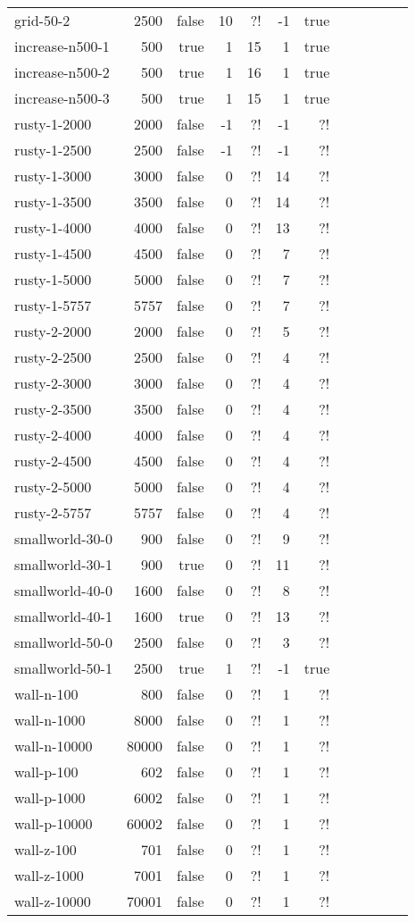 \documentclass{tufte-handout}
\begin{document}
\begin{longtable}{lrrrrrrrrrrr}
	grid-50-2 & 2500 & false & 10 & ?! & -1 & true\\
	increase-n500-1 & 500 & true & 1 & 15 & 1 & true\\
	increase-n500-2 & 500 & true & 1 & 16 & 1 & true\\
	increase-n500-3 & 500 & true & 1 & 15 & 1 & true\\
	rusty-1-2000 & 2000 & false & -1 & ?! & -1 & ?!\\
	rusty-1-2500 & 2500 & false & -1 & ?! & -1 & ?!\\
	rusty-1-3000 & 3000 & false & 0 & ?! & 14 & ?!\\
	rusty-1-3500 & 3500 & false & 0 & ?! & 14 & ?!\\
	rusty-1-4000 & 4000 & false & 0 & ?! & 13 & ?!\\
	rusty-1-4500 & 4500 & false & 0 & ?! & 7 & ?!\\
	rusty-1-5000 & 5000 & false & 0 & ?! & 7 & ?!\\
	rusty-1-5757 & 5757 & false & 0 & ?! & 7 & ?!\\
	rusty-2-2000 & 2000 & false & 0 & ?! & 5 & ?!\\
	rusty-2-2500 & 2500 & false & 0 & ?! & 4 & ?!\\
	rusty-2-3000 & 3000 & false & 0 & ?! & 4 & ?!\\
	rusty-2-3500 & 3500 & false & 0 & ?! & 4 & ?!\\
	rusty-2-4000 & 4000 & false & 0 & ?! & 4 & ?!\\
	rusty-2-4500 & 4500 & false & 0 & ?! & 4 & ?!\\
	rusty-2-5000 & 5000 & false & 0 & ?! & 4 & ?!\\
	rusty-2-5757 & 5757 & false & 0 & ?! & 4 & ?!\\
	smallworld-30-0 & 900 & false & 0 & ?! & 9 & ?!\\
	smallworld-30-1 & 900 & true & 0 & ?! & 11 & ?!\\
	smallworld-40-0 & 1600 & false & 0 & ?! & 8 & ?!\\
	smallworld-40-1 & 1600 & true & 0 & ?! & 13 & ?!\\
	smallworld-50-0 & 2500 & false & 0 & ?! & 3 & ?!\\
	smallworld-50-1 & 2500 & true & 1 & ?! & -1 & true\\
	wall-n-100 & 800 & false & 0 & ?! & 1 & ?!\\
	wall-n-1000 & 8000 & false & 0 & ?! & 1 & ?!\\
	wall-n-10000 & 80000 & false & 0 & ?! & 1 & ?!\\
	wall-p-100 & 602 & false & 0 & ?! & 1 & ?!\\
	wall-p-1000 & 6002 & false & 0 & ?! & 1 & ?!\\
	wall-p-10000 & 60002 & false & 0 & ?! & 1 & ?!\\
	wall-z-100 & 701 & false & 0 & ?! & 1 & ?!\\
	wall-z-1000 & 7001 & false & 0 & ?! & 1 & ?!\\
	wall-z-10000 & 70001 & false & 0 & ?! & 1 & ?!\\

	\bottomrule
\end{longtable}
\medskip
\end{document}
